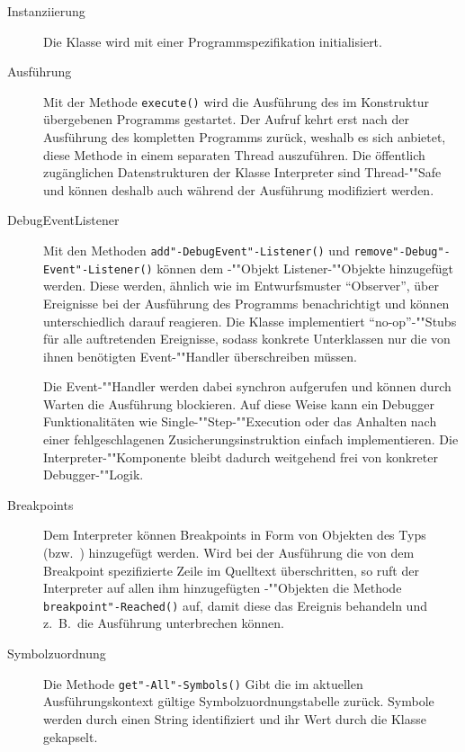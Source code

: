 \begin{description}
    \item[Instanziierung] Die Klasse  wird mit einer Programmspezifikation initialisiert.

    \item[Ausführung] Mit der Methode \texttt{execute()} wird die Ausführung des im Konstruktur übergebenen Programms gestartet. Der Aufruf kehrt erst nach der Ausführung des kompletten Programms zurück, weshalb es sich anbietet, diese Methode in einem separaten Thread auszuführen. Die öffentlich zugänglichen Datenstrukturen der Klasse Interpreter sind Thread-""Safe und können deshalb auch während der Ausführung modifiziert werden.

    \item[DebugEventListener]
    Mit den Methoden \texttt{add"-DebugEvent"-Listener()} und \texttt{remove"-Debug"-Event"-Listener()} können dem -""Objekt Listener-""Objekte hinzugefügt werden. Diese werden, ähnlich wie im Entwurfsmuster "`Observer"', über Ereignisse bei der Ausführung des Programms benachrichtigt und können unterschiedlich darauf reagieren. Die Klasse  implementiert "`no-op"'-""Stubs für alle auftretenden Ereignisse, sodass konkrete Unterklassen nur die von ihnen benötigten Event-""Handler überschreiben müssen.

    Die Event-""Handler werden dabei synchron aufgerufen und können durch Warten die Ausführung blockieren. Auf diese Weise kann ein Debugger Funktionalitäten wie Single-""Step-""Execution oder das Anhalten nach einer fehlgeschlagenen Zusicherungsinstruktion einfach implementieren. Die Interpreter-""Komponente bleibt dadurch weitgehend frei von konkreter Debugger-""Logik.

    \item[Breakpoints]
    Dem Interpreter können Breakpoints in Form von Objekten des Typs  (bzw.\ ) hinzugefügt werden. Wird bei der Ausführung die von dem Breakpoint spezifizierte Zeile im Quelltext überschritten, so ruft der Interpreter auf allen ihm hinzugefügten -""Objekten die Methode \texttt{breakpoint"-Reached()} auf, damit diese das Ereignis behandeln und z.~B.\ die Ausführung unterbrechen können.

    \item[Symbolzuordnung]
    Die Methode \texttt{get"-All"-Symbols()} Gibt die im aktuellen Ausführungskontext gültige Symbolzuordnungstabelle zurück. Symbole werden durch einen String identifiziert und ihr Wert durch die Klasse  gekapselt.


\end{description}
